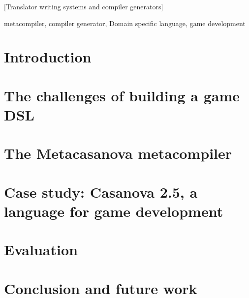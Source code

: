 \documentclass{sigplanconf}
\begin{document}
[Translator writing systems and compiler generators]


\keywords
metacompiler, compiler generator, Domain specific language, game development

\section{Introduction}
\label{sec:introduction}



\section{The challenges of building a game DSL}
\label{sec:problem_statement}




\section{The Metacasanova metacompiler}
\label{sec:formal_description}



\section{Case study: Casanova 2.5, a language for game development}
\label{sec:casanova3}



\section{Evaluation}
\label{sec:evaluation}



\section{Conclusion and future work}
\label{sec:future_works}




\end{document}

